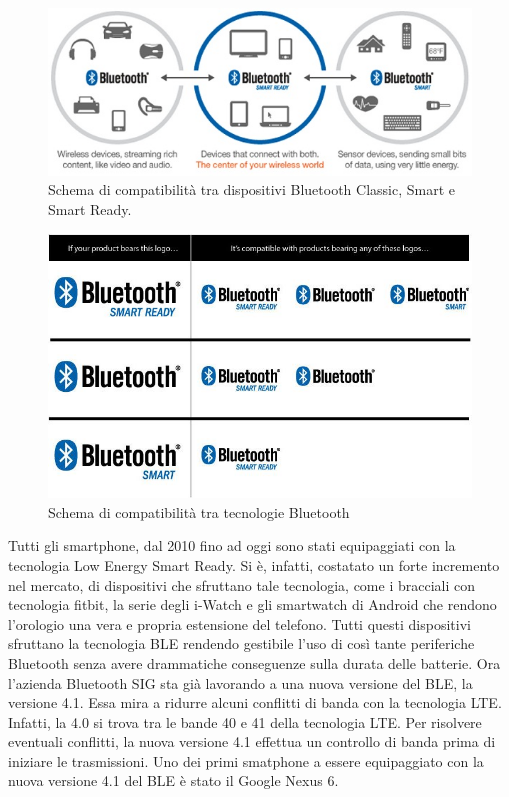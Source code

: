 \begin{figure}[t]
	\centering
	\includegraphics[width=0.9\linewidth, keepaspectratio]{Images/bt/bt_01}
	\caption[Schema di compatibilità.]{Schema di compatibilità tra dispositivi Bluetooth Classic, Smart e Smart Ready.}
	\label{fig:bt_01}
\end{figure}

\begin{figure}[ht]
	\centering
	\includegraphics[width=0.9\linewidth, keepaspectratio]{Images/bt/bt_02}
	\caption[Compatibilità tecnologie]{Schema di compatibilità tra tecnologie Bluetooth}
	\label{fig:bt_02}
\end{figure}
Tutti gli smartphone, dal 2010 fino ad oggi sono stati equipaggiati con la tecnologia Low Energy Smart Ready. Si è, infatti, costatato un forte incremento nel mercato, di dispositivi che sfruttano tale tecnologia, come i bracciali con tecnologia fitbit, la serie degli i-Watch e gli smartwatch di Android che rendono l’orologio una vera e propria estensione del telefono. Tutti questi dispositivi sfruttano la tecnologia \acs{BLE} rendendo gestibile l’uso di così tante periferiche Bluetooth senza avere drammatiche conseguenze sulla durata delle batterie. Ora l’azienda Bluetooth SIG sta già lavorando a una nuova versione del \acs{BLE}, la versione 4.1. Essa mira a ridurre alcuni conflitti di banda con la tecnologia \acf{LTE}. Infatti, la 4.0 si trova tra le bande 40 e 41 della tecnologia \acs{LTE}. Per risolvere eventuali conflitti, la nuova versione 4.1 effettua un controllo di banda prima di iniziare le trasmissioni. Uno dei primi smatphone a essere equipaggiato con la nuova versione 4.1 del \acs{BLE} è stato il Google Nexus 6.
\bigskip

